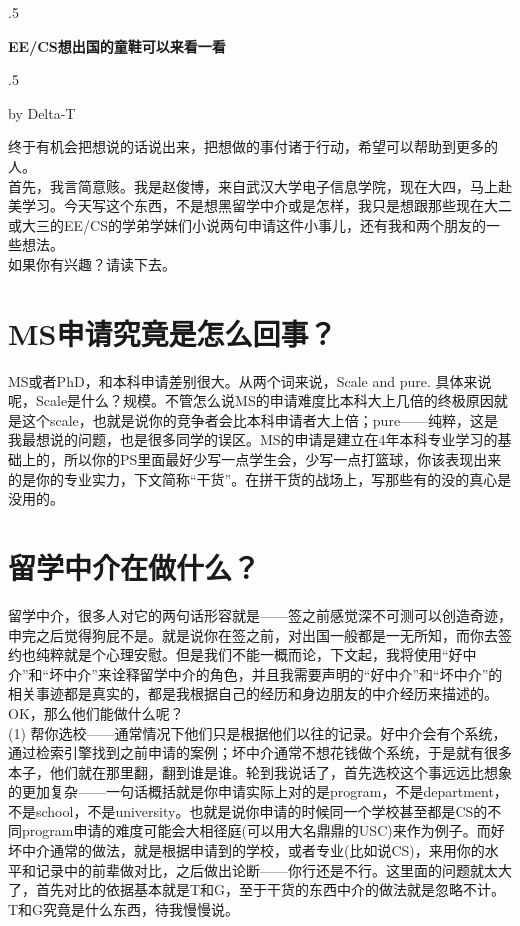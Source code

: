 \documentclass{article}
\begin{document}
\moveleft.5\hoffset\centerline{\huge\bf EE/CS想出国的童鞋可以来看一看 }
\moveleft.5\hoffset\centerline{\large by Delta-T}
\vspace{10pt}

终于有机会把想说的话说出来，把想做的事付诸于行动，希望可以帮助到更多的人。\\

首先，我言简意赅。我是赵俊博，来自武汉大学电子信息学院，现在大四，马上赴美学习。今天写这个东西，不是想黑留学中介或是怎样，我只是想跟那些现在大二或大三的EE/CS的学弟学妹们小说两句申请这件小事儿，还有我和两个朋友的一些想法。\\

 
如果你有兴趣？请读下去。
\section{MS申请究竟是怎么回事？}
MS或者PhD，和本科申请差别很大。从两个词来说，Scale and pure. 具体来说呢，Scale是什么？规模。不管怎么说MS的申请难度比本科大上几倍的终极原因就是这个scale，也就是说你的竞争者会比本科申请者大上倍；pure——纯粹，这是我最想说的问题，也是很多同学的误区。MS的申请是建立在4年本科专业学习的基础上的，所以你的PS里面最好少写一点学生会，少写一点打篮球，你该表现出来的是你的专业实力，下文简称“干货”。在拼干货的战场上，写那些有的没的真心是没用的。

\section{留学中介在做什么？}
留学中介，很多人对它的两句话形容就是——签之前感觉深不可测可以创造奇迹，申完之后觉得狗屁不是。就是说你在签之前，对出国一般都是一无所知，而你去签约也纯粹就是个心理安慰。但是我们不能一概而论，下文起，我将使用“好中介”和“坏中介”来诠释留学中介的角色，并且我需要声明的“好中介”和“坏中介”的相关事迹都是真实的，都是我根据自己的经历和身边朋友的中介经历来描述的。OK，那么他们能做什么呢？\\
 
(1) 帮你选校——通常情况下他们只是根据他们以往的记录。好中介会有个系统，通过检索引擎找到之前申请的案例；坏中介通常不想花钱做个系统，于是就有很多本子，他们就在那里翻，翻到谁是谁。轮到我说话了，首先选校这个事远远比想象的更加复杂——一句话概括就是你申请实际上对的是program，不是department，不是school，不是university。也就是说你申请的时候同一个学校甚至都是CS的不同program申请的难度可能会大相径庭(可以用大名鼎鼎的USC)来作为例子。而好坏中介通常的做法，就是根据申请到的学校，或者专业(比如说CS)，来用你的水平和记录中的前辈做对比，之后做出论断——你行还是不行。这里面的问题就太大了，首先对比的依据基本就是T和G，至于干货的东西中介的做法就是忽略不计。T和G究竟是什么东西，待我慢慢说。\\
\end{document}
